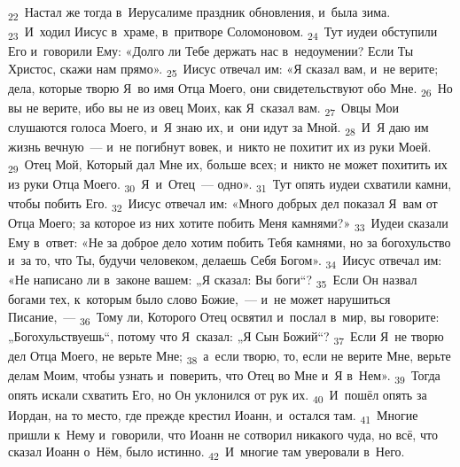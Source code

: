 \documentclass[a4paper,12pt]{article}
\begin{document}
\textsubscript{22}~Настал же тогда в~Иерусалиме праздник обновления, и~была зима. \textsubscript{23}~И~ходил Иисус в~храме, в~притворе Соломоновом. \textsubscript{24}~Тут иудеи обступили Его и~говорили Ему: «Долго ли Тебе держать нас в~недоумении? Если Ты Христос, скажи нам прямо». \textsubscript{25}~Иисус отвечал им: «Я сказал вам, и~не верите; дела, которые творю Я~во имя Отца Моего, они свидетельствуют обо Мне. \textsubscript{26}~Но вы не верите, ибо вы не из овец Моих, как Я~сказал вам. \textsubscript{27}~Овцы Мои слушаются голоса Моего, и~Я знаю их, и~они идут за Мной. \textsubscript{28}~И~Я даю им жизнь вечную~--- и~не погибнут вовек, и~никто не похитит их из руки Моей. \textsubscript{29}~Отец Мой, Который дал Мне их, больше всех; и~никто не может похитить их из руки Отца Моего. \textsubscript{30}~Я~и~Отец~--- одно». \textsubscript{31}~Тут опять иудеи схватили камни, чтобы побить Его. \textsubscript{32}~Иисус отвечал им: «Много добрых дел показал Я~вам от Отца Моего; за которое из них хотите побить Меня камнями?» \textsubscript{33}~Иудеи сказали Ему в~ответ: «Не за доброе дело хотим побить Тебя камнями, но за богохульство и~за то, что Ты, будучи человеком, делаешь Себя Богом». \textsubscript{34}~Иисус отвечал им: «Не написано ли в~законе вашем: „Я сказал: Вы боги“? \textsubscript{35}~Если Он назвал богами тех, к~которым было слово Божие,~--- и~не может нарушиться Писание,~--- \textsubscript{36}~Тому ли, Которого Отец освятил и~послал в~мир, вы говорите: „Богохульствуешь“, потому что Я~сказал: „Я Сын Божий“? \textsubscript{37}~Если Я~не творю дел Отца Моего, не верьте Мне; \textsubscript{38}~а~если творю, то, если не верите Мне, верьте делам Моим, чтобы узнать и~поверить, что Отец во Мне и~Я в~Нем». \textsubscript{39}~Тогда опять искали схватить Его, но Он уклонился от рук их. \textsubscript{40}~И~пошёл опять за Иордан, на то место, где прежде крестил Иоанн, и~остался там. \textsubscript{41}~Многие пришли к~Нему и~говорили, что Иоанн не сотворил никакого чуда, но всё, что сказал Иоанн о~Нём, было истинно. \textsubscript{42}~И~многие там уверовали в~Него. 
\end{document}
